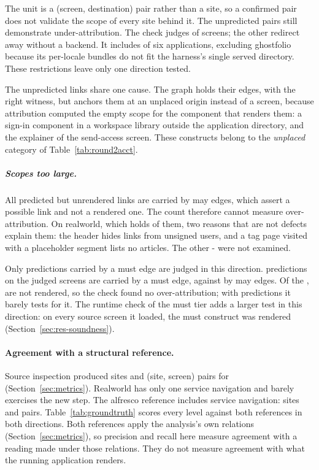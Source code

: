 The unit is a (screen, destination) pair rather than a site, so a confirmed pair does not validate
the scope of every site behind it. The unpredicted pairs still demonstrate
under-attribution.
The check judges \ScopeJudged{} of \ScopeScreens{} screens; the other \ScopeUnjudged{} redirect away
without a backend. It includes \ScopeApps{} of six applications, excluding ghostfolio because its
per-locale bundles do not fit the harness's single served directory. These restrictions leave only
one direction tested.

The \ScopeUnpredicted{} unpredicted links share one cause. The graph holds their edges, with the
right witness, but anchors them at an unplaced origin instead of a screen, because attribution
computed the empty scope for the component that renders them: a sign-in component in a workspace
library outside the application directory, and the explainer of the send-access screen. These constructs
belong to the \emph{unplaced} category of Table~\ref{tab:round2acct}.

\subparagraph{Scopes too large.} All \ScopeUnrendered{} predicted but unrendered links are
carried by may edges, which assert a possible link and not a rendered one. The count therefore
cannot measure over-attribution. On realworld, which holds \ScopeUnrenderedRealworld{} of them, two reasons
that are not defects explain them: the header hides links from unsigned users, and a tag page
visited with a placeholder segment lists no articles. The other
\the\numexpr\ScopeUnrendered-\ScopeUnrenderedRealworld\relax{} were not examined.

Only predictions carried by a must edge are judged in this direction.
\ScopeExact{} predictions on the judged screens are carried by a must edge, against \ScopeApprox{} by may
edges. Of the \ScopeExact{}, \ScopeOverAttributed{} are not rendered, so the check found no
over-attribution; with \ScopeExact{} predictions it barely tests for it. The runtime check of the
must tier adds a larger test in this direction: on every source screen it loaded, the must
construct was rendered (Section~\ref{sec:res-soundness}).

\paragraph{Agreement with a structural reference.}
\label{sec:res-groundtruth}

Source inspection produced \GTSites{} sites and \GTPairs{} (site, screen) pairs for \GTApp{}
(Section~\ref{sec:metrics}). Realworld has only one service navigation and barely exercises the
new step. The alfresco reference includes service navigation: \GTAlfSites{} sites and
\GTAlfPairs{} pairs. Table~\ref{tab:groundtruth} scores every level against both references in
both directions. Both references apply the analysis's own relations (Section~\ref{sec:metrics}),
so precision and recall here measure agreement with a reading made under those relations. They do
not measure agreement with what the running application renders.

